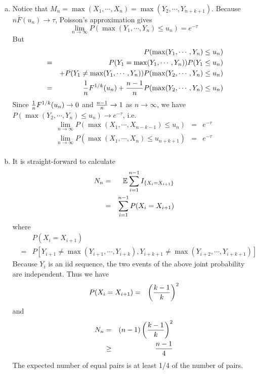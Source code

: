 \documentclass{report}
\begin{document}
\begin{enumerate}[1.]
\begin{enumerate}[(a)]
  \item Notice that $M_n=\max(X_1, \cdots, X_n) = \max(Y_2, \cdots,
    Y_{n+k+1})$. Because $n \bar{F}(u_n) \to \tau$, Poisson's
    approximation gives
    \[
    \lim_{n \to \infty} P(\max(Y_1, \cdots, Y_n) \le u_n) = e^{-\tau}
    \]
    But
    \begin{eqnarray*}
      && P(\max(Y_1, \cdots, Y_n) \le u_n) \\
      &=& P(Y_1 = \max(Y_1, \cdots, Y_n)) P(Y_1 \le u_n) \\
      && +P(Y_1 \ne \max(Y_1, \cdots, Y_n)) P(\max(Y_2, \cdots, Y_n) \le
      u_n) \\
      &=& {1 \over n} F^{1/k}(u_n) + {n-1 \over n} P(\max(Y_2, \cdots,
      Y_n) \le u_n)
    \end{eqnarray*}
    Since ${1 \over n} F^{1/k}(u_n) \to 0$ and ${n-1 \over n} \to 1$
    as $n \to \infty$, we have $P(\max(Y_2, \cdots, Y_n) \le u_n)
    \to e^{-\tau}$, i.e.
    \begin{eqnarray*}
      \lim_{n \to \infty} P(\max(X_1, \cdots, X_{n-k-1}) \le u_n) &=&
      e^{-\tau}\\
      \lim_{n \to \infty} P(\max(X_1, \cdots, X_{n}) \le u_{n+k+1}) &=&
      e^{-\tau}\\
    \end{eqnarray*}

  \item It is straight-forward to calculate
    \begin{eqnarray*}
      N_n &=& \mathbb{E} \sum_{i=1}^{n-1} I_{\{X_i = X_{i+1}\}} \\
      &=& \sum_{i=1}^{n-1} P(X_i = X_{i+1}) \\
    \end{eqnarray*}
    where
    \begin{eqnarray*}
      && P(X_i = X_{i+1}) \\
      &=& P[Y_{i+1} \ne \max(Y_{i+1}, \cdots,
      Y_{i+k}), Y_{i+k+1} \ne \max(Y_{i+2}, \cdots, Y_{i+k+1})]
    \end{eqnarray*}
    Because $Y_i$ is an iid sequence, the two events of the above
    joint probability are independent. Thus we have
    \begin{eqnarray*}
      P(X_i = X_{i+1}) &=& \left({k-1 \over k}\right)^2
    \end{eqnarray*}
    and
    \begin{eqnarray*}
      N_n &=& (n-1) \left({k-1 \over k}\right)^2 \\
      &\ge& {n-1 \over 4}
    \end{eqnarray*}
    The expected number of equal pairs is at least 1/4 of the number
    of pairs.
  \end{enumerate}
\end{enumerate}
\end{document}
